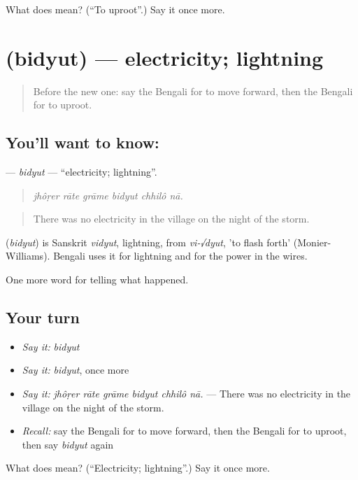 \begin{tcolorbox}[breakable,colback=teal!4,colframe=teal!35!black,title={Before you move on}]
What does  mean? (\textquotedblleft{}To uproot\textquotedblright{}.) Say it once more.
\end{tcolorbox}
\section[\texorpdfstring{\bn{বিদ্যুৎ} (bidyut)}{বিদ্যুৎ (bidyut)}]{ (bidyut) — electricity; lightning}

\label{lesson:BN-C288-bidyut}



\begin{quote}
Before the new one: say the Bengali for to move forward, then the Bengali for to uproot.
\end{quote}

\subsection*{You'll want to know: }
\textbf{} — \emph{bidyut} — \textquotedblleft{}electricity; lightning\textquotedblright{}.

\begin{quote}
     
\end{quote}

\begin{quote}
\emph{jhôṛer rāte grāme bidyut chhilô nā.}
\end{quote}

\begin{quote}
There was no electricity in the village on the night of the storm.
\end{quote}

\begin{cousinweb}
\textbf{} (\emph{bidyut}) is Sanskrit \emph{vidyut}, lightning, from \emph{vi-√dyut}, 'to flash forth' (Monier-Williams). Bengali uses it for lightning and for the power in the wires.
\end{cousinweb}

\begin{grammarlens}[title={What you've built}]
One more word for telling what happened.
\end{grammarlens}

\subsection*{Your turn}
\begin{itemize}
\raggedright
  \item \emph{Say it:} \emph{bidyut}
  \item \emph{Say it:} \emph{bidyut}, once more
  \item \emph{Say it:} \emph{jhôṛer rāte grāme bidyut chhilô nā.} — There was no electricity in the village on the night of the storm.
  \item \emph{Recall:} say the Bengali for to move forward, then the Bengali for to uproot, then say \emph{bidyut} again
\end{itemize}

\begin{tcolorbox}[breakable,colback=teal!4,colframe=teal!35!black,title={Before you move on}]
What does  mean? (\textquotedblleft{}Electricity; lightning\textquotedblright{}.) Say it once more.
\end{tcolorbox}
